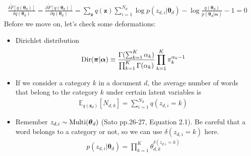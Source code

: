\documentclass[a4paper,10.5pt,dvipdfmx]{jarticle}  %
\begin{document}
\begin{align}
	\frac{\delta \widetilde{F}[q(\boldsymbol{\theta}_d)]}{\delta q(\boldsymbol{\theta}_d)} = \frac{\partial \widetilde{F}[q(\boldsymbol{\theta}_d)]}{\partial q(\boldsymbol{\theta}_d)} = \sum_{\boldsymbol{z}} q(\boldsymbol{z}) \sum_{i=1}^{N_d} \log p(z_{d,i} | \boldsymbol{\theta}_d) - \log \frac{q(\boldsymbol{\theta}_d)}{p(\boldsymbol{\theta}_d | \boldsymbol{\alpha})} - 1 = 0
\end{align}
Before we move on, let's check some deformations:
\begin{itemize}
\item Dirichlet distribution
\begin{align}
	{\rm Dir}(\boldsymbol{\pi} | \boldsymbol{\alpha}) \equiv \frac{\Gamma(\sum_{k=1}^{K} \alpha_k)}{\prod_{k=1}^{K} \Gamma(\alpha_k)} \prod_{k=1}^{K} \pi_{k}^{\alpha_k - 1} 
\end{align}
\item If we consider a category $k$ in a document $d$, the average number of words that belong to the category $k$ under certain latent variables is
\begin{align}
	\mathbb{E}_{q(\boldsymbol{z}_d)}[N_{d,k}] = \sum_{i=1}^{N_d} q(z_{d,i} = k) \label{Eq:N_dk}
\end{align}
\item Remember $z_{d,i} \sim {\rm Multi}(\boldsymbol{\theta}_d)$ (Sato pp.26-27, Equation 2.1). Be careful that a word belongs to a category or not, so we can use $\delta(z_{d,i}=k)$ here.
\begin{align}
	p(z_{d,i} | \boldsymbol{\theta}_d) = \prod_{k=1}^{K} \theta_{d,k}^{\delta(z_{d,i} = k)}
\end{align}
\end{itemize}
\end{document}
